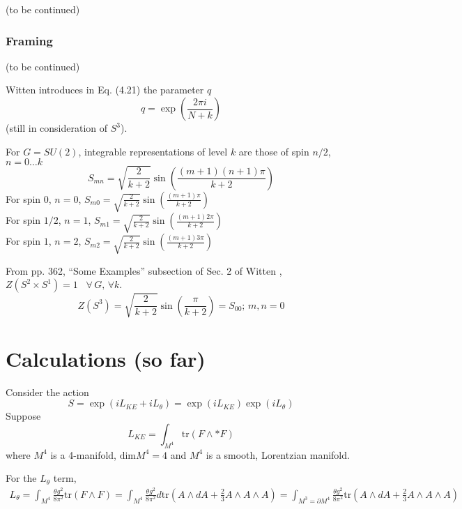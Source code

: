 \documentclass[10pt]{amsart}
\begin{document}
\begin{multicols}{2}
(to be continued)
  

  


\subsubsection{Framing}

(to be continued)


Witten introduces in Eq. (4.21) \cite{Witten:1988hf} the parameter $q$
\[
q = \exp{ \left( \frac{2\pi i }{ N + k } \right) }
\]
(still in consideration of $S^3$).

For $G=SU(2)$, integrable representations of level $k$ are those of spin $n/2$, $n=0 \dots k$
\[
S_{mn} = \sqrt{ \frac{2}{k+2} } \sin{\left( \frac{ (m+1)(n+1)\pi }{ k+2} \right) }
\]
For spin $0$, $n=0$, $S_{m0} = \sqrt{ \frac{2}{k+2} } \sin{ \left( \frac{ (m+1) \pi  }{ k+2} \right) }$  \\
For spin $1/2$, $n=1$, $S_{m1} = \sqrt{ \frac{2}{k+2} } \sin{ \left( \frac{ (m+1) 2\pi  }{ k+2} \right) }$  \\
For spin $1$, $n=2$, $S_{m2} = \sqrt{ \frac{2}{k+2} } \sin{ \left( \frac{ (m+1) 3\pi  }{ k+2} \right) }$

From pp. 362, ``Some Examples'' subsection of Sec. 2 of Witten \cite{Witten:1988hf}, $Z(S^2 \times S^1) =1$ \, $\forall \, G, \, \forall k$.
\[
Z(S^3)=\sqrt{ \frac{2}{k+2} } \sin{ \left( \frac{ \pi}{k+2} \right)} = S_{00}; \, m,n=0
\]


\section{Calculations (so far)}

Consider the action
\begin{equation}
  S = \exp{ (i L_{KE} + i L_{\theta} ) } = \exp{ (i L_{KE})} \exp{ (i L_{\theta} ) }
\end{equation}
Suppose
\[
L_{KE} = \int_{M^4} \text{tr}(F\wedge * F)
\]
where $M^4$ is a 4-manifold, $\text{dim}M^4=4$ and $M^4$ is a smooth, Lorentzian manifold.  

For the $L_{\theta}$ term,
\[
\begin{gathered}
  L_{\theta} = \int_{M^4} \frac{ \theta g^2}{8\pi^2} \text{tr}(F\wedge F) = \int_{M^4} \frac{ \theta g^2}{8 \pi^2} d\text{tr}(A\wedge dA + \frac{2}{3} A \wedge A \wedge A ) = \int_{M^3 = \partial M^4} \frac{ \theta g^2}{8 \pi^2} \text{tr}(A\wedge dA + \frac{2}{3} A\wedge A \wedge A )
  \end{gathered}
\]


\end{multicols}
\end{document}
